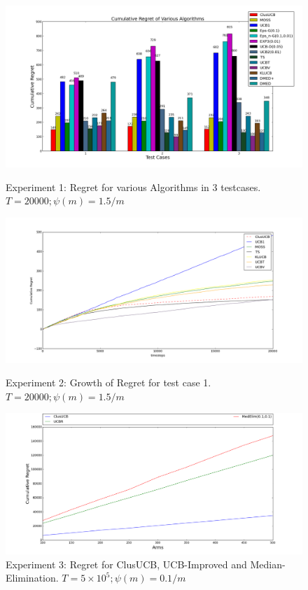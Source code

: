 \begin{figure}[!tbp]
\centering
\begin{minipage}[b]{0.4\textwidth}
\includegraphics[width=\textwidth]{img/cl_final12.png}
\caption{Experiment 1: Regret for various Algorithms in 3 testcases. $T=20000; \psi(m)=1.5/m$}
\end{minipage}
\hspace{0.1em}
\begin{minipage}[b]{0.4\textwidth}
\includegraphics[width=\textwidth]{img/cl_final2.png}
\caption{Experiment 2: Growth of Regret for test case 1. $T=20000; \psi(m)=1.5/m$}
\end{minipage}
\hspace{0.1em}
\begin{minipage}[b]{0.4\textwidth}
\includegraphics[width=\textwidth]{img/cl_final3.png}
\caption{Experiment 3: Regret for ClusUCB, UCB-Improved and Median-Elimination. $T=5\times10^5; \psi(m)=0.1/m$}
\end{minipage}
\hspace{0.1em}
\end{figure}

